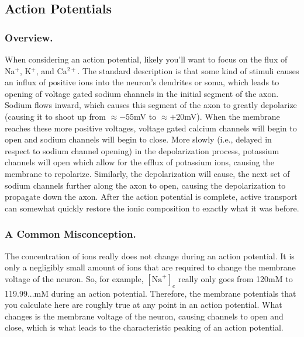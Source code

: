 \documentclass[12pt]{report}
\begin{document}
\subsection{Action Potentials}

\subsubsection{Overview.}

When considering an action potential, likely you'll want to focus on the flux of Na$^+$, K$^+$, and Ca$^{2+}$. The standard description is that some kind of stimuli causes an influx of positive ions into the neuron's dendrites or soma, which leads to opening of voltage gated sodium channels in the initial segment of the axon. Sodium flows inward, which causes this segment of the axon to greatly depolarize (causing it to shoot up from $\approx -55$mV to $\approx +20$mV). When the membrane reaches these more positive voltages, voltage gated calcium channels will begin to open and sodium channels will begin to close. More slowly (i.e., delayed in respect to sodium channel opening) in the depolarization process, potassium channels will open which allow for the efflux of potassium ions, causing the membrane to repolarize.  Similarly, the depolarization will cause, the next set of sodium channels further along the axon to open, causing the depolarization to propagate down the axon. After the action potential is complete, active transport can somewhat quickly restore the ionic composition to exactly what it was before.\newline


\subsubsection{A Common Misconception.}

The concentration of ions really does not change during an action potential. It is only a negligibly small amount of ions that are required to change the membrane voltage of the neuron. So, for example, $[\mathrm{Na}^+]_e$ really only goes from 120mM to 119.99...mM during an action potential. Therefore, the membrane potentials that you calculate here are roughly true at any point in an action potential. What changes is the membrane voltage of the neuron, causing channels to open and close, which is what leads to the characteristic peaking of an action potential.\newline
\end{document}
